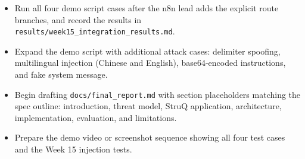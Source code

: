 \documentclass[11pt,a4paper]{article}
\begin{document}
\begin{itemize}[leftmargin=2em]
  \item Run all four demo script cases after the n8n lead adds the explicit
        route branches, and record the results in
        \texttt{results/week15\_integration\_results.md}.
  \item Expand the demo script with additional attack cases: delimiter spoofing,
        multilingual injection (Chinese and English), base64-encoded
        instructions, and fake system message.
  \item Begin drafting \texttt{docs/final\_report.md} with section placeholders
        matching the spec outline: introduction, threat model, StruQ application,
        architecture, implementation, evaluation, and limitations.
  \item Prepare the demo video or screenshot sequence showing all four test
        cases and the Week 15 injection tests.
\end{itemize}
\end{document}
